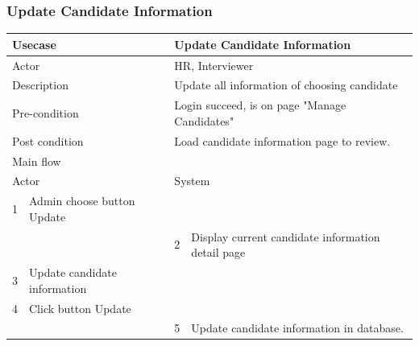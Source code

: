 \documentclass[a4paper]{article}
\begin{document}
\subsubsection{Update Candidate Information}
\begin{tabular}{|l|p{5cm}||l|p{5cm}|}
	\hline 
	\multicolumn{2}{|p{5cm}|}{Usecase} & \multicolumn{2}{|p{5cm}|}{Update Candidate Information}\\ 
	\hline 
	\multicolumn{2}{|p{5cm}|}{Actor} & \multicolumn{2}{|p{5cm}|}{HR, Interviewer} \\ 
	\hline 
	\multicolumn{2}{|p{5cm}|}{Description} & \multicolumn{2}{|p{5cm}|}{Update all information of choosing candidate}\\
	\hline
	\multicolumn{2}{|p{5cm}|}{Pre-condition} & \multicolumn{2}{|p{5cm}|}{Login succeed, is on page "Manage Candidates"}\\
	\hline
	\multicolumn{2}{|p{5cm}|}{Post condition} & \multicolumn{2}{|p{5cm}|}{Load candidate information page to review.} \\
	\hline
	\multicolumn{4}{|l|}{Main flow} \\
	\hline
	\multicolumn{2}{|p{5cm}|}{Actor} & \multicolumn{2}{|p{5cm}|}{System} \\
	\hline
	1 & Admin choose button Update & & \\
	\hline
	& & 2 & Display current candidate information detail page \\
	\hline
	3 & Update candidate information & & \\
	\hline
	4 & Click button Update & & \\
	\hline	
	& & 5 &Update candidate information in database. \\	
	\hline 			
\end{tabular}
\end{document}
